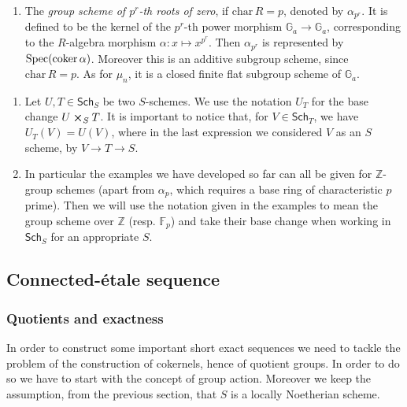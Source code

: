 \documentclass[../Main]{subfiles}
\begin{document}
\begin{ex}
\begin{enumerate}
		\item The {\em group scheme of $p^r$-th roots of zero},
			if $\mathrm{char}\, R = p$, denoted by $\alpha_{p^r}$. 
			It is defined to be the kernel of the $p^r$-th power
			morphism $\mathbb{G}_a \to \mathbb{G}_a$,
			corresponding to the $R$-algebra morphism
			$\alpha\colon x \mapsto x^{p^r}$.
			Then $\alpha_{p^r}$ is represented by $\mathrm{Spec}(\operatorname{coker} \alpha)$.
			Moreover this is an additive subgroup scheme, since $\mathrm{char}\, R = p$.
			As for $\mu_n$, it is a closed finite flat subgroup scheme of 
			$\mathbb{G}_a$.
	\end{enumerate}
\end{ex}


\begin{rem}\leavevmode\vspace{-\baselineskip}
\begin{enumerate}
\item 	Let $U, T \in \mathsf{Sch}_{ S }$ be two $S$-schemes.
	We use the notation $U_T$ for the base change $U \cross_{ S } T$.
	It is important to notice that, for $V \in \mathsf{Sch}_{ T }$, we 
	have $U_T(V) = U(V)$, where in the last expression
	we considered $V$ as an $S$ scheme, by $V \to T \to S$.


\item	In particular the examples we have developed so far 
	can all be given for $\mathbb{Z}$-group schemes
	(apart from $\alpha_p$, which requires a base ring
	of characteristic $p$ prime).
	Then we will use the notation given in the examples
	to mean the group scheme over $\mathbb{Z}$ (resp$.$ $\mathbb{F}_{p}$)
	and take their base change when working in $\mathsf{Sch}_{ S }$
	for an appropriate $S$.
\end{enumerate}
\end{rem}


\subsection{Connected-étale sequence}
\subsubsection{Quotients and exactness}
In order to construct some important short exact sequences
we need to tackle the problem of the construction
of cokernels, hence of quotient groups.
In order to do so we have to start with the concept of group action.
Moreover we keep the assumption, from the previous section, that $S$
is a locally Noetherian scheme.
\end{document}
